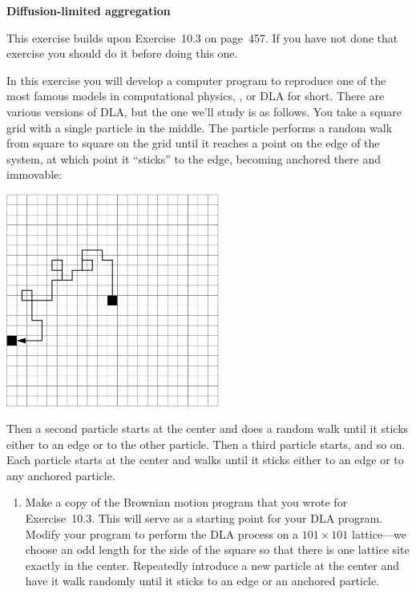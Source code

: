 \documentclass[12pt]{article}
\begin{document}
\begin{exercises}

\exercise \textbf{Diffusion-limited aggregation}

\exskip This exercise builds upon Exercise~10.3 on page~457.  If you have
not done that exercise you should do it before doing this one.

In this exercise you will develop a computer program to reproduce one of
the most famous models in computational physics, , or DLA for short.  There are various versions of DLA, but
the one we'll study is as follows.  You take a square grid with a single
particle in the middle.  The particle performs a random walk from square to
square on the grid until it reaches a point on the edge of the system, at
which point it ``sticks'' to the edge, becoming anchored there and
immovable:
\medskip
\begin{center}
\includegraphics[width=7cm]{dla.eps}
\end{center}
Then a second particle starts at the center and does a random walk until it
sticks either to an edge or to the other particle.  Then a third particle
starts, and so on.  Each particle starts at the center and walks until it
sticks either to an edge or to any anchored particle.

\begin{enumerate}\setlength{\itemsep}{0pt}
\item Make a copy of the Brownian motion program that you wrote for
  Exercise~10.3.  This will serve as a starting point for your DLA program.
  Modify your program to perform the DLA process on a $101\times101$
  lattice---we choose an odd length for the side of the square so that
  there is one lattice site exactly in the center.  Repeatedly introduce a
  new particle at the center and have it walk randomly until it sticks to
  an edge or an anchored particle.


\end{enumerate}
\end{exercises}
\end{document}
